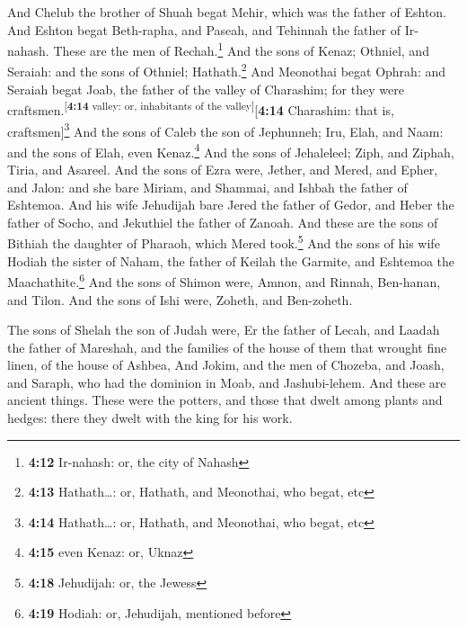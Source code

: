  And Chelub the brother of Shuah begat Mehir, which was
the father of Eshton.  And Eshton begat Beth-rapha, and
Paseah, and Tehinnah the father of Ir-nahash. These are the men of
Rechah.\footnote{\textbf{4:12} Ir-nahash: or, the city of Nahash}
 And the sons of Kenaz; Othniel, and Seraiah: and the
sons of Othniel; Hathath.\footnote{\textbf{4:13} Hathath\ldots: or,
  Hathath, and Meonothai, who begat, etc}  And Meonothai
begat Ophrah: and Seraiah begat Joab, the father of the valley of
Charashim; for they were craftsmen.\textsuperscript{{[}\textbf{4:14}
valley: or, inhabitants of the valley{]}}{[}\textbf{4:14} Charashim:
that is, craftsmen{]}\footnote{\textbf{4:14} Hathath\ldots: or, Hathath,
  and Meonothai, who begat, etc}  And the sons of Caleb
the son of Jephunneh; Iru, Elah, and Naam: and the sons of Elah, even
Kenaz.\footnote{\textbf{4:15} even Kenaz: or, Uknaz}  And
the sons of Jehaleleel; Ziph, and Ziphah, Tiria, and Asareel.
 And the sons of Ezra were, Jether, and Mered, and Epher,
and Jalon: and she bare Miriam, and Shammai, and Ishbah the father of
Eshtemoa.  And his wife Jehudijah bare Jered the father
of Gedor, and Heber the father of Socho, and Jekuthiel the father of
Zanoah. And these are the sons of Bithiah the daughter of Pharaoh, which
Mered took.\footnote{\textbf{4:18} Jehudijah: or, the Jewess}
 And the sons of his wife Hodiah the sister of Naham, the
father of Keilah the Garmite, and Eshtemoa the Maachathite.\footnote{\textbf{4:19}
  Hodiah: or, Jehudijah, mentioned before}  And the sons
of Shimon were, Amnon, and Rinnah, Ben-hanan, and Tilon. And the sons of
Ishi were, Zoheth, and Ben-zoheth.

 The sons of Shelah the son of Judah were, Er the father
of Lecah, and Laadah the father of Mareshah, and the families of the
house of them that wrought fine linen, of the house of Ashbea,
 And Jokim, and the men of Chozeba, and Joash, and
Saraph, who had the dominion in Moab, and Jashubi-lehem. And these are
ancient things.  These were the potters, and those that
dwelt among plants and hedges: there they dwelt with the king for his
work.

